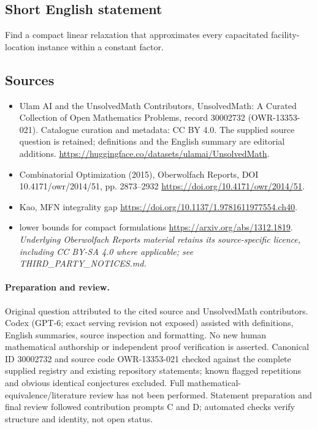 \documentclass[11pt]{article}
\begin{document}
\subsection{Short English statement}
Find a compact linear relaxation that approximates every capacitated facility-location instance within a constant factor.
\subsection{Sources}
\begin{itemize}
\item[\hypertarget{source:30002732:1}{S1}] Ulam AI and the UnsolvedMath Contributors, UnsolvedMath: A Curated Collection of Open Mathematics Problems, record 30002732 (OWR-13353-021). Catalogue curation and metadata: CC BY 4.0. The supplied source question is retained; definitions and the English summary are editorial additions.
\url{https://huggingface.co/datasets/ulamai/UnsolvedMath}.
\item[\hypertarget{source:30002732:2}{S2}] Combinatorial Optimization (2015), Oberwolfach Reports, DOI 10.4171/owr/2014/51, pp. 2873--2932
\url{https://doi.org/10.4171/owr/2014/51}.
\item[\hypertarget{source:30002732:3}{S3}] Kao, MFN integrality gap
\url{https://doi.org/10.1137/1.9781611977554.ch40}.
\item[\hypertarget{source:30002732:4}{S4}] lower bounds for compact formulations
\url{https://arxiv.org/abs/1312.1819}.
\textit{Underlying Oberwolfach Reports material retains its source-specific licence, including CC BY-SA 4.0 where applicable; see THIRD\_PARTY\_NOTICES.md.}
\end{itemize}
\paragraph{Preparation and review.}
Original question attributed to the cited source and UnsolvedMath contributors. Codex (GPT-6; exact serving revision not exposed) assisted with definitions, English summaries, source inspection and formatting. No new human mathematical authorship or independent proof verification is asserted. Canonical ID 30002732 and source code OWR-13353-021 checked against the complete supplied registry and existing repository statements; known flagged repetitions and obvious identical conjectures excluded. Full mathematical-equivalence/literature review has not been performed. Statement preparation and final review followed contribution prompts C and D; automated checks verify structure and identity, not open status.
\label{end:30002732}
\end{document}
